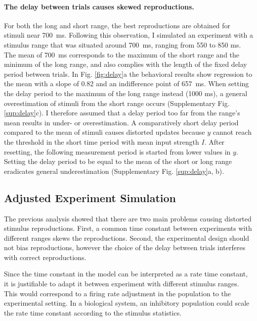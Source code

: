 \documentclass[10pt, a4paper]{article}
\begin{document}
\paragraph{The delay between trials causes skewed reproductions.}
For both the long and short range, the best reproductions are obtained for stimuli near 700~ms.
Following this observation, I simulated an experiment with a stimulus range that was situated around 700~ms, ranging from 550 to 850 ms. 
The mean of 700~ms corresponds to the maximum of the short range and the minimum of the long range, and also complies with the length of the fixed delay period between trials.
In Fig. \ref{fig:delay}a the behavioral results show regression to the mean with a slope of 0.82 and an indifference point of 657~ms.
When setting the delay period to the maximum of the long range instead (1000 ms), a general overestimation of stimuli from the short range occurs (Supplementary Fig. \ref{sup:delay}c).
I therefore assumed that a delay period too far from the range's mean results in under- or overestimation. 
A comparatively short delay period compared to the mean of stimuli causes distorted updates because $y$ cannot reach the threshold in the short time period with mean input strength $I$. 
After resetting, the following measurement period is started from lower values in $y$. 
Setting the delay period to be equal to the mean of the short or long range 
eradicates general underestimation (Supplementary Fig. \ref{sup:delay}a, b).

\subsection{Adjusted Experiment Simulation}
The previous analysis showed that there are two main problems causing distorted stimulus reproductions. 
First, a common time constant between experiments with different ranges skews the reproductions.
Second, the experimental design should not bias reproductions, however the choice of the delay between trials interferes with correct reproductions. %

Since the time constant in the model can be interpreted as a rate time constant, it is justifiable to adapt it between experiment with different stimulus ranges. 
This would correspond to a firing rate adjustment in the population to the experimental setting.
In a biological system, an inhibitory population could scale the rate time constant according to the stimulus statistics.
\end{document}
